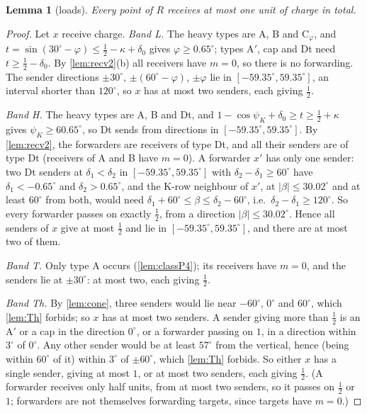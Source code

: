 \documentclass[11pt]{amsart}
\newtheorem{lemma}[theorem]{Lemma}
\theoremstyle{definition}
\theoremstyle{remark}
\begin{document}
\begin{lemma}[loads]\label{lem:loads}
Every point of $R$ receives at most one unit of charge in total.
\end{lemma}
\begin{proof}
Let $x$ receive charge. \emph{Band L.} The heavy types are A, B and C$_\varphi$, and $t=\sin(30^\circ-\varphi)\le\frac12-\kappa+\delta_0$ gives $\varphi\ge0.65^\circ$; types A$'$, cap and Dt need $t\ge\frac12-\delta_0$. By \cref{lem:recv2}(b) all receivers have $m=0$, so there is no forwarding. The sender directions $\pm30^\circ$, $\pm(60^\circ-\varphi)$, $\pm\varphi$ lie in $[-59.35^\circ,59.35^\circ]$, an interval shorter than $120^\circ$, so $x$ has at most two senders, each giving $\frac12$.

\emph{Band H.} The heavy types are A, B and Dt, and $1-\cos\psi_K+\delta_0\ge t\ge\frac12+\kappa$ gives $\psi_K\ge60.65^\circ$, so Dt sends from directions in $[-59.35^\circ,59.35^\circ]$. By \cref{lem:recv2}, the forwarders are receivers of type Dt, and all their senders are of type Dt (receivers of A and B have $m=0$). A forwarder $x'$ has only one sender: two Dt senders at $\delta_1<\delta_2$ in $[-59.35^\circ,59.35^\circ]$ with $\delta_2-\delta_1\ge60^\circ$ have $\delta_1<-0.65^\circ$ and $\delta_2>0.65^\circ$, and the K-row neighbour of $x'$, at $|\beta|\le30.02^\circ$ and at least $60^\circ$ from both, would need $\delta_1+60^\circ\le\beta\le\delta_2-60^\circ$, i.e.\ $\delta_2-\delta_1\ge120^\circ$. So every forwarder passes on exactly $\frac12$, from a direction $|\beta|\le30.02^\circ$. Hence all senders of $x$ give at most $\frac12$ and lie in $[-59.35^\circ,59.35^\circ]$, and there are at most two of them.

\emph{Band T.} Only type A occurs (\cref{lem:classP4}); its receivers have $m=0$, and the senders lie at $\pm30^\circ$: at most two, each giving $\frac12$.

\emph{Band Th.} By \cref{lem:cone}, three senders would lie near $-60^\circ$, $0^\circ$ and $60^\circ$, which \cref{lem:Th} forbids; so $x$ has at most two senders. A sender giving more than $\frac12$ is an A$'$ or a cap in the direction $0^\circ$, or a forwarder passing on $1$, in a direction within $3^\circ$ of $0^\circ$. Any other sender would be at least $57^\circ$ from the vertical, hence (being within $60^\circ$ of it) within $3^\circ$ of $\pm60^\circ$, which \cref{lem:Th} forbids. So either $x$ has a single sender, giving at most $1$, or at most two senders, each giving $\frac12$. (A forwarder receives only half units, from at most two senders, so it passes on $\frac12$ or $1$; forwarders are not themselves forwarding targets, since targets have $m=0$.)
\end{proof}
\end{document}
